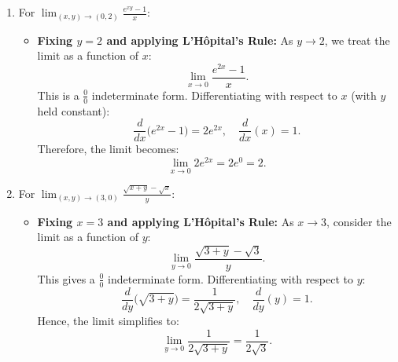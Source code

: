 \begin{example}
\begin{solution}
\begin{enumerate}
    \item For \( \displaystyle \lim_{(x,y) \to (0,2)} \frac{e^{xy}-1}{x} \):
    \begin{itemize}
        \item \textbf{Fixing \(y=2\) and applying L'Hôpital's Rule:} As \(y \to 2\), we treat the limit as a function of \(x\):
        \[
        \lim_{x\to 0} \frac{e^{2x}-1}{x}.
        \]
        This is a \( \frac{0}{0} \) indeterminate form. Differentiating with respect to \(x\) (with \(y\) held constant):
        \[
        \frac{d}{dx}\bigl(e^{2x}-1\bigr)=2e^{2x}, \quad \frac{d}{dx}(x)=1.
        \]
        Therefore, the limit becomes:
        \[
        \lim_{x\to 0} 2e^{2x} = 2e^0 = 2.
        \]
    \end{itemize}

    \item For \( \displaystyle \lim_{(x,y) \to (3,0)} \frac{\sqrt{x+y}-\sqrt{x}}{y} \):
    \begin{itemize}
        \item \textbf{Fixing \(x=3\) and applying L'Hôpital's Rule:} As \(x \to 3\), consider the limit as a function of \(y\):
        \[
        \lim_{y\to 0} \frac{\sqrt{3+y}-\sqrt{3}}{y}.
        \]
        This gives a \( \frac{0}{0} \) indeterminate form. Differentiating with respect to \(y\):
        \[
        \frac{d}{dy}\bigl(\sqrt{3+y}\bigr)=\frac{1}{2\sqrt{3+y}}, \quad \frac{d}{dy}(y)=1.
        \]
        Hence, the limit simplifies to:
        \[
        \lim_{y\to 0} \frac{1}{2\sqrt{3+y}} = \frac{1}{2\sqrt{3}}.
        \]
    \end{itemize}
\end{enumerate}
\end{solution}
\end{example}
\exampleline


